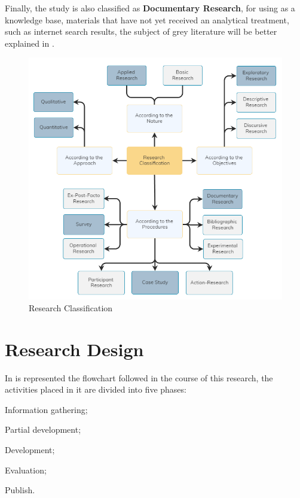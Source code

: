 
Finally, the study is also classified as \textbf{Documentary Research}, for using as a knowledge base, materials that have not yet received an analytical treatment, such as internet search results, the subject of grey literature will be better explained in .

\begin{figure}[!htb]
  \caption{Research Classification}
  \label{fig:research-classification}
  \begin{center}
    \includegraphics[width=14cm]{img/2-pesquisa-survey.png}
  \end{center}
\end{figure}

\section{Research Design}\label{sec:met-design}

In  is represented the flowchart followed in the course of this research, the activities placed in it are divided into five phases:
\begin{inparaenum}[(1)]
  \item Information gathering;
  \item Partial development;
  \item Development;
  \item Evaluation;
  \item Publish.
\end{inparaenum}

